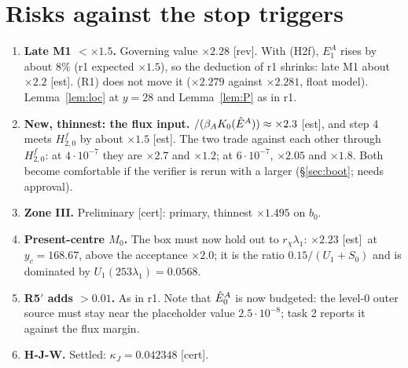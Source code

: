 \documentclass[11pt]{article}
\theoremstyle{definition}\newtheorem{definition}[theorem]{Definition}
\theoremstyle{remark}\newtheorem{remark}[theorem]{Remark}
\newcommand{\fn}[1]{\texttt{\detokenize{#1}}}
\newcommand{\tC}{\textup{[cert]}}\newcommand{\tE}{\textup{[est]}}\newcommand{\tP}{\textup{[paper]}}\newcommand{\tR}{\textup{[rev]}}
\begin{document}
\section{Risks against the stop triggers}\label{sec:risk}
\begin{enumerate}[leftmargin=*,itemsep=2pt]
\item \textbf{Late M1 $<\times1.5$.} Governing value $\times2.28$ \tR. With (H2f), $E_1^A$ rises by about $8\%$ (r1 expected $\times1.5$), so the deduction of r1 shrinks: late M1 about $\times2.2$ \tE. (R1) does not move it ($\times2.279$ against $\times2.281$, float model). Lemma~\ref{lem:loc} at $y=28$ and Lemma~\ref{lem:P} as in r1.
\item \textbf{New, thinnest: the flux input.} \fn{FLUX0}$/(\beta_AK_0(\hat E^A))\approx\times2.3$ \tE, and step 4 meets $H^f_{2,0}$ by about $\times1.5$ \tE. The two trade against each other through $H^f_{2,0}$: at $4\cdot10^{-7}$ they are $\times2.7$ and $\times1.2$; at $6\cdot10^{-7}$, $\times2.05$ and $\times1.8$. Both become comfortable if the verifier is rerun with a larger \fn{FLUX0} (\S\ref{sec:boot}; needs approval).
\item \textbf{Zone III.} Preliminary \tC: primary, thinnest $\times1.495$ on $b_0$.
\item \textbf{Present-centre $M_0$.} The box must now hold out to $r_\chi\lambda_1$: $\times2.23$ \tE\ at $y_c=168.67$, above the acceptance $\times2.0$; it is the ratio $0.15/(U_1+S_0)$ and is dominated by $U_1(253\lambda_1)=0.0568$.
\item \textbf{R5$'$ adds $>0.01$.} As in r1. Note that $\hat E^A_0$ is now budgeted: the level-0 outer source must stay near the placeholder value $2.5\cdot10^{-8}$; task 2 reports it against the flux margin.
\item \textbf{H-J-W.} Settled: $\kappa_J=0.042348$ \tC.
\end{enumerate}
\end{document}
